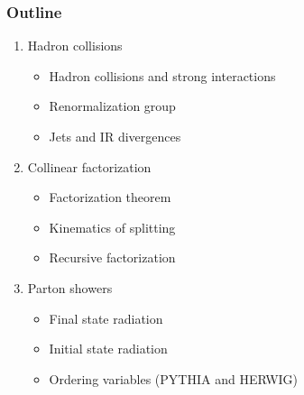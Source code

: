 \documentclass[aspectratio=43]{beamer}
\begin{document}
\begin{frame}

	\frametitle{Outline}
	
	\begin{enumerate}
		\item {\color{blue}Hadron collisions}
		\begin{itemize}
			\item Hadron collisions and strong interactions
			\item Renormalization group
			\item Jets and IR divergences
		\end{itemize}
		\item {\color{blue}Collinear factorization}
		\begin{itemize}
			\item Factorization theorem
			\item Kinematics of splitting
			\item Recursive factorization
		\end{itemize}
		\item {\color{blue}Parton showers}
		\begin{itemize}
			\item Final state radiation
			\item Initial state radiation
			\item Ordering variables (PYTHIA and HERWIG)
		\end{itemize}
	\end{enumerate}
	
\end{frame}

\begin{frame}


\end{frame}
\end{document}
